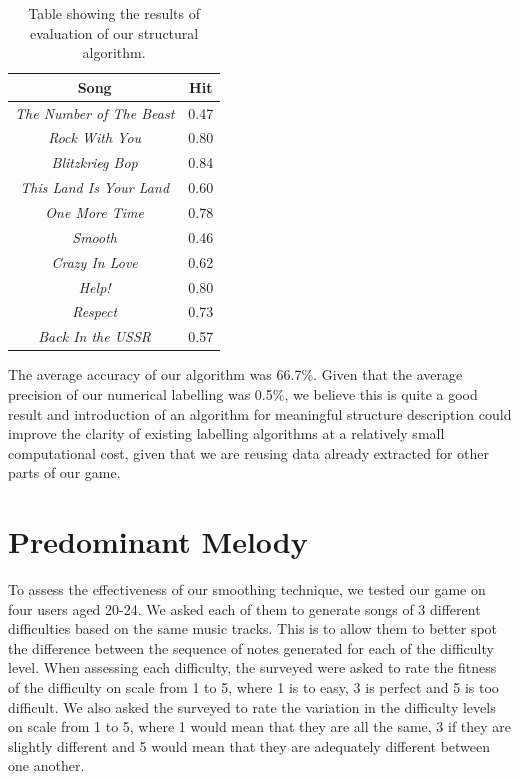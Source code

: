 \begin{table}
\begin{center}
\begin{tabular}{| c | c |} \hline 
Song  											&  Hit		\\ \hline \hline
\textit{The Number of The Beast} 	&  0.47	\\ \hline
\textit{Rock With You}						&	0.80	\\ \hline
\textit{Blitzkrieg Bop} 						&	0.84	\\ \hline
\textit{This Land Is Your Land} 		&	0.60	\\ \hline
\textit{One More Time}					&	0.78	\\ \hline
\textit{Smooth}								&	0.46	\\ \hline
\textit{Crazy In Love}						&	0.62	\\ \hline
\textit{Help!}									&	0.80	\\ \hline
\textit{Respect}								&	0.73	\\ \hline
\textit{Back In the USSR}				&	0.57	\\ \hline

\end{tabular}
\caption{Table showing the results of evaluation of our structural algorithm.}
\label{table:labelresults}
\end{center}
\end{table}

The average accuracy of our algorithm was 66.7\%. Given that the average precision of our numerical labelling was 0.5\%, we believe this is quite a good result and introduction of an algorithm for meaningful structure description could improve the clarity of existing labelling algorithms at a relatively small computational cost, given that we are reusing data already extracted for other parts of our game.

\section{Predominant Melody}

To assess the effectiveness of our smoothing technique, we tested our game on four users aged 20-24. We asked each of them to generate songs of 3 different difficulties based on the same music tracks. This is to allow them to better spot the difference between the sequence of notes generated for each of the difficulty level. When assessing each difficulty, the surveyed were asked to rate the fitness of the difficulty on scale from 1 to 5, where 1 is to easy, 3 is perfect and 5 is too difficult. We also asked the surveyed to rate the variation in the difficulty levels on scale from 1 to 5, where 1 would mean that they are all the same, 3 if they are slightly different and 5 would mean that they are adequately different between one another. 

